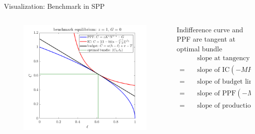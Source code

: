 \documentclass[11pt,aspectratio=43]{beamer}
\theoremstyle{definition}
\begin{document}
\begin{frame}{Visualization: Benchmark in SPP}
\label{slide:Visualization__Benchmark_in_SPP}
    \begin{columns}
        \begin{column}{0.5\textwidth}
            \begin{figure}
                \includegraphics[width=\textwidth]{./figures/benchmark.png}
            \end{figure}
        \end{column}
        \begin{column}{0.5\textwidth}
            Indifference curve and PPF are tangent at optimal bundle
            \begin{align*}
                    & \text{slope at tangency } ( C_{0}, l_{0} )
                \\
                = \quad
                    & \text{slope of IC} (-MRS_{l, C})
                \\
                = \quad
                    & \text{slope of budget line} (-w)
                \\
                = \quad
                    & \text{slope of PPF} (-MRT_{l, C})
                \\
                = \quad
                    & \text{slope of production fcn} (-MPN)
            \end{align*}
        \end{column}
    \end{columns}
\end{frame}
\end{document}
